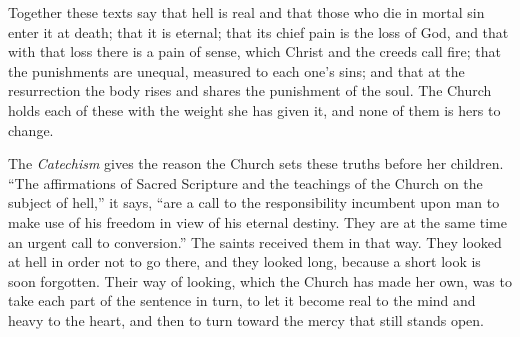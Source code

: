 Together these texts say that hell is real and that those who die in mortal sin enter it at death; that it is eternal; that its chief pain is the loss of God, and that with that loss there is a pain of sense, which Christ and the creeds call fire; that the punishments are unequal, measured to each one's sins; and that at the resurrection the body rises and shares the punishment of the soul. The Church holds each of these with the weight she has given it, and none of them is hers to change.

The \emph{Catechism} gives the reason the Church sets these truths before her children. ``The affirmations of Sacred Scripture and the teachings of the Church on the subject of hell,'' it says, ``are a call to the responsibility incumbent upon man to make use of his freedom in view of his eternal destiny. They are at the same time an urgent call to conversion.'' The saints received them in that way. They looked at hell in order not to go there, and they looked long, because a short look is soon forgotten. Their way of looking, which the Church has made her own, was to take each part of the sentence in turn, to let it become real to the mind and heavy to the heart, and then to turn toward the mercy that still stands open.
